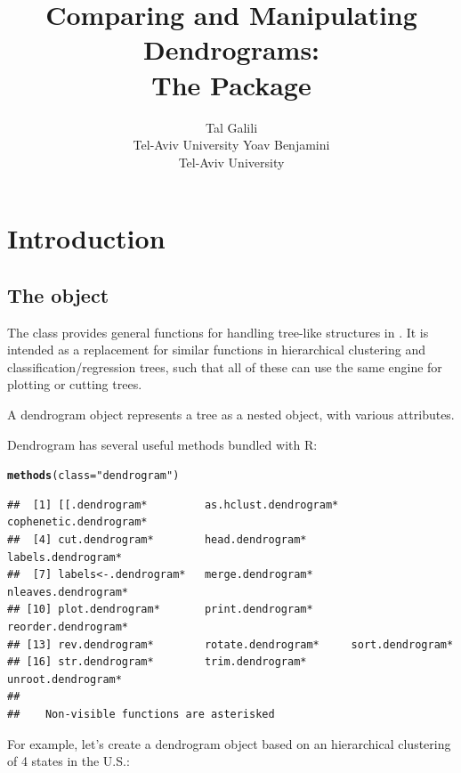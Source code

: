 \documentclass[shortnames,nojss,article]{jss}\usepackage{graphicx, color}
\author{Tal Galili\\Tel-Aviv University \And Yoav Benjamini\\Tel-Aviv University}
\title{Comparing and Manipulating Dendrograms:\\ The \pkg{dendextend} \proglang{R} Package}
\makeatletter
\newcommand{\hlfunctioncall}[1]{\textcolor[rgb]{0.501960784313725,0,0.329411764705882}{\textbf{#1}}}%
\newcommand{\hlstring}[1]{\textcolor[rgb]{0.6,0.6,1}{#1}}%
\newenvironment{kframe}{%
 \def\at@end@of@kframe{}%
 \ifinner\ifhmode%
  \def\at@end@of@kframe{\end{minipage}}%
  \begin{minipage}{\columnwidth}%
 \fi\fi%
 \def\FrameCommand##1{\hskip\@totalleftmargin \hskip-\fboxsep
 \colorbox{shadecolor}{##1}\hskip-\fboxsep
     \hskip-\linewidth \hskip-\@totalleftmargin \hskip\columnwidth}%
 \MakeFramed {\advance\hsize-\width
   \@totalleftmargin\z@ \linewidth\hsize
   \@setminipage}}%
 {\par\unskip\endMakeFramed%
 \at@end@of@kframe}
\newenvironment{knitrout}{}{} %
\makeatother
\begin{document}
\vspace*{-0.25cm}



\section{Introduction}

\subsection{The  object}

The  class provides general functions for handling tree-like structures in  \citep{R:Main}. It is intended as a replacement for similar functions in hierarchical clustering and classification/regression trees, such that all of these can use the same engine for plotting or cutting trees.

A dendrogram object represents a tree as a nested  object, with various attributes.

Dendrogram has several useful methods bundled with R:

\begin{knitrout}
\color{fgcolor}\begin{kframe}
\begin{alltt}
\hlfunctioncall{methods}(class = \hlstring{"dendrogram"})
\end{alltt}
\begin{verbatim}
##  [1] [[.dendrogram*         as.hclust.dendrogram*  cophenetic.dendrogram*
##  [4] cut.dendrogram*        head.dendrogram*       labels.dendrogram*    
##  [7] labels<-.dendrogram*   merge.dendrogram*      nleaves.dendrogram*   
## [10] plot.dendrogram*       print.dendrogram*      reorder.dendrogram*   
## [13] rev.dendrogram*        rotate.dendrogram*     sort.dendrogram*      
## [16] str.dendrogram*        trim.dendrogram*       unroot.dendrogram*    
## 
##    Non-visible functions are asterisked
\end{verbatim}
\end{kframe}
\end{knitrout}


For example, let's create a dendrogram object based on an hierarchical clustering of 4 states in the U.S.:
\end{document}
